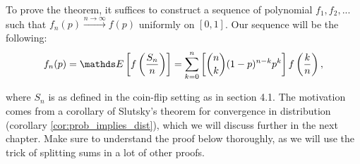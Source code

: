 To prove the theorem, it suffices to construct a sequence of polynomial $f_1, f_2, ...$ such that $f_n(p) \overset{n\to\infty}\to f(p)$ uniformly on $[0,1]$. Our sequence will be the following:
\begin{equation}
f_n(p) = \E\sqbracket{f\bracket{\frac{S_n}{n}}} = \sum_{k=0}^n \sqbracket{{n\choose k} (1-p)^{n-k} p^k} f\bracket{\frac{k}{n}},
\end{equation}

where $S_n$ is as defined in the coin-flip setting as in section 4.1. The motivation comes from a corollary of Slutsky's theorem for convergence in distribution (corollary \ref{cor:prob_implies_dist}), which we will discuss further in the next chapter. Make sure to understand the proof below thoroughly, as we will use the trick of splitting sums in a lot of other proofs.

